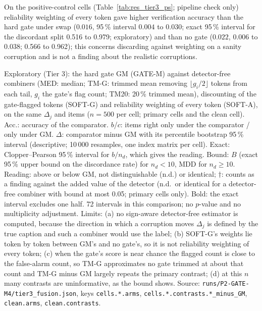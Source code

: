 On the positive-control cells (Table~\ref{tab:res_tier3_ps}; pipeline check only) reliability weighting of every token gave higher
verification accuracy than the hard gate under swap ($0.016$, 95\,\% interval $0.004$ to $0.030$; exact 95\,\% interval for the
discordant split 0.516 to 0.979; exploratory) and than no gate ($0.022$, $0.006$ to $0.038$; 0.566 to 0.962); this concerns discarding
against weighting on a sanity corruption and is not a finding about the realistic corruptions.

\begin{table}[!tbp]
\centering
\caption{Exploratory (Tier 3): the hard gate GM (GATE-M) against detector-free combiners (MED: median; TM-G: trimmed mean removing
$\lfloor g_i/2\rfloor$ tokens from each tail, $g_i$ the gate's flag count; TM20: 20\,\% trimmed mean), discounting of the gate-flagged
tokens (SOFT-G) and reliability weighting of every token (SOFT-A), on the same $\Delta_j$ and items ($n=500$ per cell; primary cells and
the clean cell). Acc.: accuracy of the comparator. $b$/$c$: items right only under the comparator / only under GM. $\Delta$: comparator
minus GM with its percentile bootstrap 95\,\% interval (descriptive; 10\,000 resamples, one index matrix per cell). Exact: Clopper--Pearson
95\,\% interval for $b/n_d$, which gives the reading. Bound: $B$ (exact 95\,\% upper bound on the discordance rate) for $n_d<10$, MDD for
$n_d\ge10$. Reading: above or below GM, not distinguishable (n.d.) or identical; $\dagger$: counts as a finding against the added value
of the detector (n.d.\ or identical for a detector-free combiner with bound at most 0.05; primary cells only). Bold: the exact interval excludes one half. 72 intervals in this
comparison; no $p$-value and no multiplicity adjustment. Limits: (a) no sign-aware detector-free estimator is computed, because the
direction in which a corruption moves $\Delta_j$ is defined by the true caption and such a combiner would use the label; (b) SOFT-G's
weights lie token by token between GM's and no gate's, so it is not reliability weighting of every token; (c) when the gate's score is
near chance the flagged count is close to the false-alarm count, so TM-G approximates no gate trimmed at about that count and TM-G
minus GM largely repeats the primary contrast; (d) at this $n$ many contrasts are uninformative, as the bound shows. Source:
\nolinkurl{runs/P2-GATE-M4/tier3_fusion.json}, keys \nolinkurl{cells.*.arms}, \nolinkurl{cells.*.contrasts.*_minus_GM},
\nolinkurl{clean.arms}, \nolinkurl{clean.contrasts}.}
\label{tab:res_tier3}
\footnotesize
\begin{adjustbox}{max width=\textwidth}

\end{adjustbox}
\end{table}
